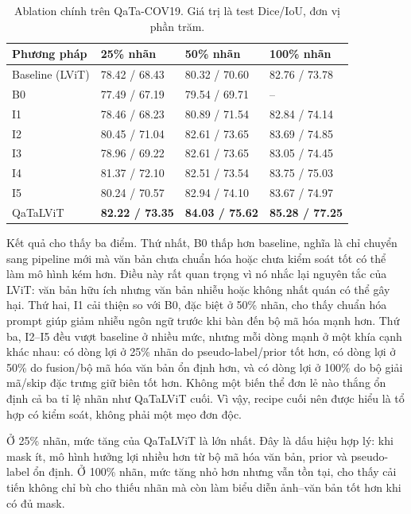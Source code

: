 \begin{table}[H]
  \centering
  \caption{Ablation chính trên QaTa-COV19. Giá trị là test Dice/IoU, đơn vị phần trăm.}
  \label{tab:qatalvit-ablation-main}
  \scriptsize
  \renewcommand{\arraystretch}{1.12}
  \setlength{\tabcolsep}{4pt}
  \begin{tabularx}{\textwidth}{@{}l Y Y Y@{}}
    \toprule
    Phương pháp & 25\% nhãn & 50\% nhãn & 100\% nhãn \\
    \midrule
    Baseline (LViT) & 78.42 / 68.43 & 80.32 / 70.60 & 82.76 / 73.78 \\
    B0 & 77.49 / 67.19 & 79.54 / 69.71 & -- \\
    I1 & 78.46 / 68.23 & 80.89 / 71.54 & 82.84 / 74.14 \\
    I2 & 80.45 / 71.04 & 82.61 / 73.65 & 83.69 / 74.85 \\
    I3 & 78.96 / 69.22 & 82.61 / 73.65 & 83.05 / 74.45 \\
    I4 & 81.37 / 72.10 & 82.51 / 73.54 & 83.75 / 75.03 \\
    I5 & 80.24 / 70.57 & 82.94 / 74.10 & 83.67 / 74.97 \\
    QaTaLViT & \textbf{82.22 / 73.35} & \textbf{84.03 / 75.62} & \textbf{85.28 / 77.25} \\
    \bottomrule
  \end{tabularx}
\end{table}
\FloatBarrier

Kết quả cho thấy ba điểm. Thứ nhất, B0 thấp hơn baseline, nghĩa là chỉ chuyển sang pipeline mới mà văn bản chưa chuẩn hóa hoặc chưa kiểm soát tốt có thể làm mô hình kém hơn. Điều này rất quan trọng vì nó nhắc lại nguyên tắc của LViT: văn bản hữu ích nhưng văn bản nhiễu hoặc không nhất quán có thể gây hại. Thứ hai, I1 cải thiện so với B0, đặc biệt ở 50\% nhãn, cho thấy chuẩn hóa prompt giúp giảm nhiễu ngôn ngữ trước khi bàn đến bộ mã hóa mạnh hơn. Thứ ba, I2--I5 đều vượt baseline ở nhiều mức, nhưng mỗi dòng mạnh ở một khía cạnh khác nhau: có dòng lợi ở 25\% nhãn do pseudo-label/prior tốt hơn, có dòng lợi ở 50\% do fusion/bộ mã hóa văn bản ổn định hơn, và có dòng lợi ở 100\% do bộ giải mã/skip đặc trưng giữ biên tốt hơn. Không một biến thể đơn lẻ nào thắng ổn định cả ba tỉ lệ nhãn như QaTaLViT cuối. Vì vậy, recipe cuối nên được hiểu là tổ hợp có kiểm soát, không phải một mẹo đơn độc.

Ở 25\% nhãn, mức tăng của QaTaLViT là lớn nhất. Đây là dấu hiệu hợp lý: khi mask ít, mô hình hưởng lợi nhiều hơn từ bộ mã hóa văn bản, prior và pseudo-label ổn định. Ở 100\% nhãn, mức tăng nhỏ hơn nhưng vẫn tồn tại, cho thấy cải tiến không chỉ bù cho thiếu nhãn mà còn làm biểu diễn ảnh--văn bản tốt hơn khi có đủ mask.

